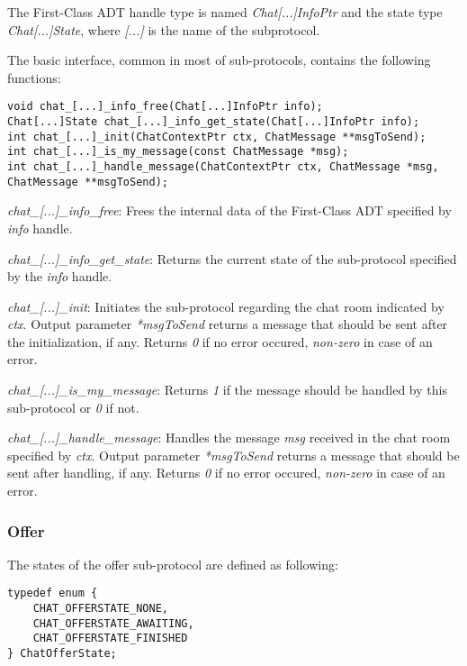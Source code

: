 The First-Class ADT handle type is named \emph{Chat[...]InfoPtr} and the state type \emph{Chat[...]State}, where \emph{[...]} is the name of the subprotocol.

The basic interface, common in most of sub-protocols, contains the following functions:

\begin{lstlisting}[caption={General sub-protocol interface},label={lst:subprotocol-interface}]
void chat_[...]_info_free(Chat[...]InfoPtr info);
Chat[...]State chat_[...]_info_get_state(Chat[...]InfoPtr info);
int chat_[...]_init(ChatContextPtr ctx, ChatMessage **msgToSend);
int chat_[...]_is_my_message(const ChatMessage *msg);
int chat_[...]_handle_message(ChatContextPtr ctx, ChatMessage *msg, ChatMessage **msgToSend);
\end{lstlisting}

\begin{description}
  \item \emph{chat\_[...]\_info\_free}: Frees the internal data of the First-Class ADT specified by \emph{info} handle.

  \item \emph{chat\_[...]\_info\_get\_state}: Returns the current state of the sub-protocol specified by the \emph{info} handle.

  \item \emph{chat\_[...]\_init}: Initiates the sub-protocol regarding the chat room indicated by \emph{ctx}. Output parameter \emph{*msgToSend} returns a message that should be sent after the initialization, if any. Returns \emph{0} if no error occured, \emph{non-zero} in case of an error. 

  \item \emph{chat\_[...]\_is\_my\_message}: Returns \emph{1} if the message should be handled by this sub-protocol or \emph{0} if not.

  \item \emph{chat\_[...]\_handle\_message}: Handles the message \emph{msg} received in the chat room specified by \emph{ctx}. Output parameter \emph{*msgToSend} returns a message that should be sent after handling, if any. Returns \emph{0} if no error occured, \emph{non-zero} in case of an error. 
\end{description}

\subsubsection{Offer}
The states of the offer sub-protocol are defined as following:
\begin{lstlisting}[caption={Offer states}]
typedef enum {
	CHAT_OFFERSTATE_NONE,
	CHAT_OFFERSTATE_AWAITING,
	CHAT_OFFERSTATE_FINISHED
} ChatOfferState;
\end{lstlisting}

